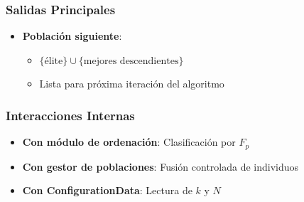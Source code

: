 \subsubsection{Salidas Principales}
\begin{itemize}
    \item \textbf{Población siguiente}:
    \begin{itemize}
        \item $\{\text{élite}\} \cup \{\text{mejores descendientes}\}$
        \item Lista para próxima iteración del algoritmo
    \end{itemize}
\end{itemize}

\subsubsection{Interacciones Internas}
\begin{itemize}
    \item \textbf{Con módulo de ordenación}: Clasificación por $F_p$
    \item \textbf{Con gestor de poblaciones}: Fusión controlada de individuos
    \item \textbf{Con ConfigurationData}: Lectura de $k$ y $N$
\end{itemize}

